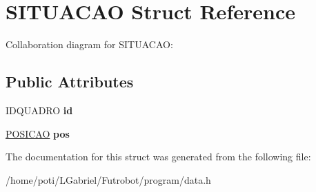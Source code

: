\hypertarget{structSITUACAO}{}\section{S\+I\+T\+U\+A\+C\+AO Struct Reference}
\label{structSITUACAO}


Collaboration diagram for S\+I\+T\+U\+A\+C\+AO\+:
\subsection*{Public Attributes}
\begin{DoxyCompactItemize}
\item 
I\+D\+Q\+U\+A\+D\+RO {\bfseries id}\hypertarget{structSITUACAO_afa00c798dfd96f7e795099ef3891384d}{}\label{structSITUACAO_afa00c798dfd96f7e795099ef3891384d}

\item 
\hyperlink{structPOSICAO}{P\+O\+S\+I\+C\+AO} {\bfseries pos}\hypertarget{structSITUACAO_ae693b49a9464354e43fa695dbf9c662a}{}\label{structSITUACAO_ae693b49a9464354e43fa695dbf9c662a}

\end{DoxyCompactItemize}


The documentation for this struct was generated from the following file\+:\begin{DoxyCompactItemize}
\item 
/home/poti/\+L\+Gabriel/\+Futrobot/program/data.\+h\end{DoxyCompactItemize}
